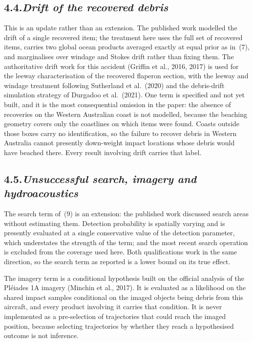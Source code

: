 \documentclass[12pt,a4paper]{article}
\begin{document}
\subsection*{4.4.\quad \textit{Drift of the recovered debris}}

This is an update rather than an extension. The published work modelled the drift of a single
recovered item; the treatment here uses the full set of recovered items, carries two global ocean
products averaged exactly at equal prior as in~(7), and marginalises over windage and Stokes
drift rather than fixing them. The authoritative drift work for this accident
(Griffin et al., 2016, 2017) is used for the leeway characterisation of the recovered flaperon
section, with the leeway and windage treatment following Sutherland et al.\ (2020) and the
debris-drift simulation strategy of Durgadoo et al.\ (2021). One term is specified and not yet built, and it is the most consequential omission in
the paper: the absence of recoveries on the Western Australian coast is not modelled, because the
beaching geometry covers only the coastlines on which items were found. Coasts outside those
boxes carry no identification, so the failure to recover debris in Western Australia cannot
presently down-weight impact locations whose debris would have beached there. Every result
involving drift carries that label.

\subsection*{4.5.\quad \textit{Unsuccessful search, imagery and hydroacoustics}}

The search term of~(9) is an extension: the published work discussed search areas without
estimating them. Detection probability is spatially varying and is presently evaluated at a
single conservative value of the detection parameter, which understates the strength of the
term; and the most recent search operation is excluded from the coverage used here. Both
qualifications work in the same direction, so the search term as reported is a lower bound on
its true effect.

The imagery term is a conditional hypothesis built on the official analysis of the Pl\'eiades 1A
imagery (Minchin et al., 2017). It is evaluated as a likelihood on the shared
impact samples conditional on the imaged objects being debris from this aircraft, and every
product involving it carries that condition. It is never implemented as a pre-selection of
trajectories that could reach the imaged position, because selecting trajectories by whether
they reach a hypothesised outcome is not inference.
\end{document}
